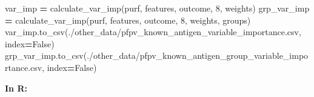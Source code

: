 \documentclass[
  11pt,
  oneside]{book}
\newenvironment{Shaded}{\begin{snugshade}}{\end{snugshade}}
\newcommand{\DecValTok}[1]{\textcolor[rgb]{0.00,0.00,0.81}{#1}}
\newcommand{\NormalTok}[1]{#1}
\newcommand{\OperatorTok}[1]{\textcolor[rgb]{0.81,0.36,0.00}{\textbf{#1}}}
\newcommand{\StringTok}[1]{\textcolor[rgb]{0.31,0.60,0.02}{#1}}
\newcommand{\VariableTok}[1]{\textcolor[rgb]{0.00,0.00,0.00}{#1}}
\begin{document}
\begin{Shaded}
\begin{Highlighting}[]
\NormalTok{var\_imp }\OperatorTok{=}\NormalTok{ calculate\_var\_imp(purf, features, outcome, }\DecValTok{8}\NormalTok{, weights)}
\NormalTok{grp\_var\_imp }\OperatorTok{=}\NormalTok{ calculate\_var\_imp(purf, features, outcome, }\DecValTok{8}\NormalTok{, weights, groups)}
\NormalTok{var\_imp.to\_csv(}\StringTok{\textquotesingle{}./other\_data/pfpv\_known\_antigen\_variable\_importance.csv\textquotesingle{}}\NormalTok{, index}\OperatorTok{=}\VariableTok{False}\NormalTok{)}
\NormalTok{grp\_var\_imp.to\_csv(}\StringTok{\textquotesingle{}./other\_data/pfpv\_known\_antigen\_group\_variable\_importance.csv\textquotesingle{}}\NormalTok{, index}\OperatorTok{=}\VariableTok{False}\NormalTok{)}
\end{Highlighting}
\end{Shaded}

\textbf{In R: }
\end{document}
